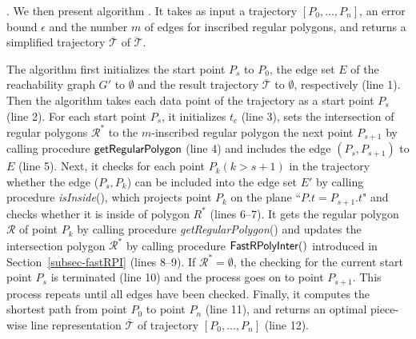 . 
We then present algorithm \cisto. 
It takes as input a trajectory ${[P_0, \ldots, P_n]}$, an error bound $\epsilon$ and the number $m$ of edges for inscribed regular polygons, and returns a simplified  trajectory $\overline{\mathcal{T}}$ of $\dddot{\mathcal{T}}$.



The algorithm first initializes the start point $P_s$ to $P_0$, the edge set $E$ of
the reachability graph $G'$ to $\emptyset$ and the result trajectory $\overline{\mathcal{T}}$ to $\emptyset$, respectively (line 1).
%
Then the algorithm takes each data point of the trajectory as a start point $P_s$ (line 2). 
For each start point $P_{s}$, it initializes $t_c$ (line 3), sets the intersection of regular polygons $\mathcal{R}^*$ to the $m$-inscribed regular polygon \wrt the next point $P_{s+1}$ by calling procedure ${\mathsf{getRegularPolygon}}$ (line 4) and includes the edge $(P_s, P_{s+1})$ to $E$ (line 5).
%
Next, it checks for each point $P_{k} (k>s+1)$ in the trajectory whether the edge ($P_{s}, P_{k}$) can be included into the edge set $E'$ by calling procedure \textit{isInside}(), which projects point $P_k$ on the plane ``$P.t = P_{s+1}.t$" and checks whether it is inside of polygon $R^*$ (lines 6--7).
%
It gets the regular polygon $\mathcal{R}$ of point $P_{k}$ by calling procedure \textit{getRegularPolygon}()
and updates the intersection polygon $\mathcal{R}^*$ by calling procedure ${\mathsf{FastRPolyInter}}()$ introduced in Section~\ref{subsec-fastRPI} (lines 8--9).
If $\mathcal{R}^* = \emptyset$, the checking for the current start point $P_s$ is terminated (line 10) and the process goes on to point $P_{s+1}$.
This process repeats until all edges have been checked.
%
Finally, it computes the shortest path from point $P_{0}$ to point $P_{n}$ (line 11), and returns an optimal piece-wise line representation $\overline{\mathcal{T}}$ of trajectory ${[P_0, \ldots, P_n]}$ (line 12).






